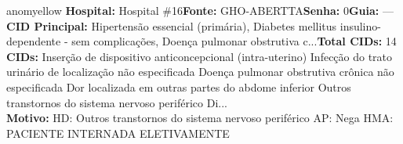 \documentclass[a4paper,10pt]{article}
\begin{document}
\begin{anomalycard}[Interna\c{c}\~{a}o \#7516 | Pac. \#2047 | MODERADO (z=2.34) | LOS: 6d | 26/02/2026\,$\to$\,04/03/2026]{anomyellow}
\textbf{Hospital:} Hospital \#16\quad \textbf{Fonte:} GHO-ABERTTA\quad \textbf{Senha:} 0\quad \textbf{Guia:} ---\\

\textbf{CID Principal:} {\small Hipertensão essencial (primária), Diabetes mellitus insulino-dependente - sem complicações, Doença pulmonar obstrutiva c...}\quad\textbf{Total CIDs:} 14\\

\textbf{CIDs:} {\scriptsize Inserção de dispositivo anticoncepcional (intra-uterino) \textbar{} Infecção do trato urinário de localização não especificada \textbar{} Doença pulmonar obstrutiva crônica não especificada \textbar{} Dor localizada em outras partes do abdome inferior \textbar{} Outros transtornos do sistema nervoso periférico \textbar{} Di...}\\

\textbf{Motivo:} {\scriptsize HD:  Outros transtornos do sistema nervoso periférico  AP: Nega  HMA: PACIENTE INTERNADA ELETIVAMENTE}\\




\end{anomalycard}
\end{document}
